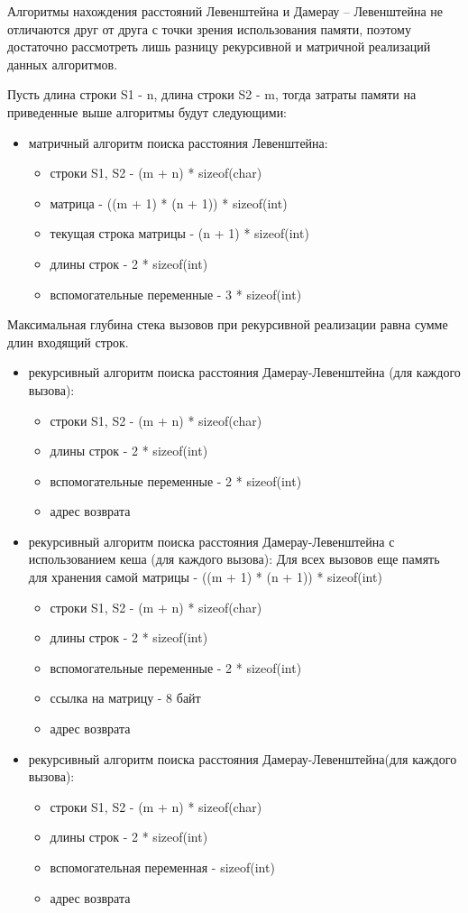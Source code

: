 Алгоритмы нахождения расстояний Левенштейна и Дамерау -- Левенштейна не отличаются друг от друга с точки зрения использования памяти, поэтому достаточно рассмотреть лишь разницу рекурсивной и матричной реализаций данных алгоритмов.

Пусть длина строки S1 - n, длина строки S2 - m, тогда затраты памяти на приведенные выше алгоритмы будут следующими:
\begin{itemize}
	\item матричный алгоритм поиска расстояния Левенштейна:\begin{itemize}
		\item строки S1, S2 - (m + n) * sizeof(char)
		\item матрица - ((m + 1) * (n + 1)) * sizeof(int)
		\item текущая строка матрицы - (n + 1) * sizeof(int)
		\item длины строк - 2 * sizeof(int)
		\item вспомогательные переменные -  3 * sizeof(int)
	\end{itemize}
\end{itemize}

Максимальная глубина стека вызовов при рекурсивной реализации равна сумме длин входящий строк.

\begin{itemize}
	\item рекурсивный алгоритм поиска расстояния Дамерау-Левенштейна (для каждого вызова):\begin{itemize}
		\item строки S1, S2 - (m + n) * sizeof(char)
		\item длины строк - 2 * sizeof(int)
		\item вспомогательные переменные -  2 * sizeof(int)
		\item адрес возврата
	\end{itemize}
	\item рекурсивный алгоритм поиска расстояния Дамерау-Левенштейна с использованием кеша (для каждого вызова): Для всех вызовов еще память для хранения самой матрицы -  ((m + 1) * (n + 1)) * sizeof(int) \begin{itemize}
		\item строки S1, S2 - (m + n) * sizeof(char)
		\item длины строк - 2 * sizeof(int)
		\item вспомогательные переменные -  2 * sizeof(int)
		\item ссылка на матрицу - 8 байт
		\item адрес возврата
	\end{itemize}
	\item рекурсивный алгоритм поиска расстояния Дамерау-Левенштейна(для каждого вызова):\begin{itemize}
		\item строки S1, S2 - (m + n) * sizeof(char)
		\item длины строк - 2 * sizeof(int)
		\item вспомогательная переменная -  sizeof(int)
		\item адрес возврата
	\end{itemize}
\end{itemize}


